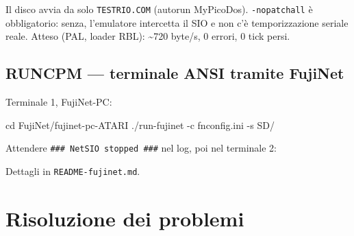 \documentclass[
]{article}
\newenvironment{Shaded}{}{}
\newcommand{\AttributeTok}[1]{\textcolor[rgb]{0.49,0.56,0.16}{#1}}
\newcommand{\BuiltInTok}[1]{\textcolor[rgb]{0.00,0.50,0.00}{#1}}
\newcommand{\DataTypeTok}[1]{\textcolor[rgb]{0.56,0.13,0.00}{#1}}
\newcommand{\ExtensionTok}[1]{#1}
\newcommand{\FunctionTok}[1]{\textcolor[rgb]{0.02,0.16,0.49}{#1}}
\newcommand{\NormalTok}[1]{#1}
\newcommand{\VariableTok}[1]{\textcolor[rgb]{0.10,0.09,0.49}{#1}}
\begin{document}
\begin{Shaded}
\end{Shaded}

Il disco avvia da solo \texttt{TESTRIO.COM} (autorun MyPicoDos).
\texttt{-nopatchall} è obbligatorio: senza, l'emulatore intercetta il
SIO e non c'è temporizzazione seriale reale. Atteso (PAL, loader RBL):
\textasciitilde720 byte/s, 0 errori, 0 tick persi.

\subsection{RUNCPM --- terminale ANSI tramite
FujiNet}\label{runcpm-terminale-ansi-tramite-fujinet}

Terminale 1, FujiNet-PC:

\begin{Shaded}
\begin{Highlighting}[]
\BuiltInTok{cd}\NormalTok{ FujiNet/fujinet{-}pc{-}ATARI}
\ExtensionTok{./run{-}fujinet} \AttributeTok{{-}c}\NormalTok{ fnconfig.ini }\AttributeTok{{-}s}\NormalTok{ SD/}
\end{Highlighting}
\end{Shaded}

Attendere \texttt{\#\#\#\ NetSIO\ stopped\ \#\#\#} nel log, poi nel
terminale 2:

\begin{Shaded}
\end{Shaded}

Dettagli in \texttt{README-fujinet.md}.

\section{Risoluzione dei problemi}\label{risoluzione-dei-problemi}
\end{document}
